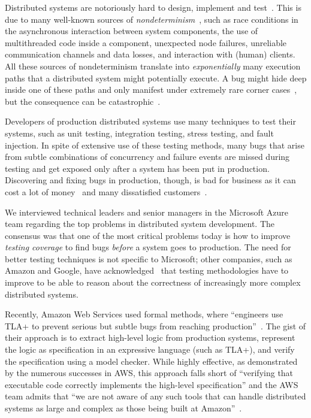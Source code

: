 Distributed systems are notoriously hard to design, implement and test~\cite{cavage2013there, laguna2015debugging, maddox2015test}. This is due to many well-known sources of \emph{nondeterminism}~\cite{chandra2007paxos}, such as race conditions in the asynchronous interaction between system components, the use of multithreaded code inside a component, unexpected node failures, unreliable communication channels and data losses, and interaction with (human) clients.
All these sources of nondeterminism translate into \emph{exponentially} many execution paths that a distributed system might potentially execute.
A bug might hide deep inside one of these paths and only manifest under extremely rare corner cases~\cite{gray1986computers, musuvathi2008finding}, but the consequence can be catastrophic~\cite{amazon2012aws, google2014outage}.

Developers of production distributed systems use many techniques to test their systems,
such as unit testing, integration testing, stress testing, and fault injection.
In spite of extensive use of these testing methods,
many bugs that arise from subtle combinations of concurrency and failure events
are missed during testing and get exposed only after a system has been put in production.
Discovering and fixing bugs in production, though, is bad for business as it can cost a lot of money~\cite{tassey2002economic} 
and many dissatisfied customers~\cite{amazon2012aws, google2014outage}.

We interviewed technical leaders and senior managers in the Microsoft Azure team regarding the top problems in distributed system development.
The consensus was that one of the most critical problems today is how to improve \emph{testing coverage} to find bugs \emph{before} a system goes to production.
The need for better testing techniques is not specific to Microsoft;
other companies, such as Amazon and Google, have acknowledged~\cite{chandra2007paxos,newcombe2015aws} that testing methodologies have to improve to be able to reason about the correctness of increasingly more complex distributed systems.

Recently, Amazon Web Services used formal methods, where ``engineers use TLA+ to prevent serious but subtle bugs from reaching production''~\cite{newcombe2015aws}. The gist of their approach is to extract high-level logic from production systems, represent the logic as specification in an expressive language (such as TLA+), and verify the specification using a model checker. While highly effective, as demonstrated by the numerous successes in AWS, this approach falls short of ``verifying that executable code correctly implements the high-level specification'' and the AWS team admits that ``we are not aware of any such tools that can handle distributed systems as large and complex as those being built at Amazon''~\cite{newcombe2015aws}.

